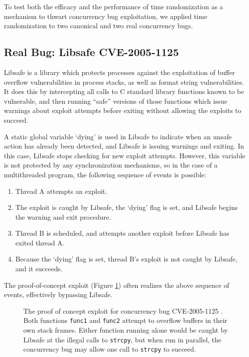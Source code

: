 To test both the efficacy and the performance of time randomization as a mechanism to thwart concurrency bug exploitation, we applied time randomization to two canonical and two real concurrency bugs.
\subsection{Real Bug: Libsafe CVE-2005-1125}
Libsafe \cite{Tsai2001} is a library which protects processes against the
exploitation of buffer overflow vulnerabilities in process stacks, as well as
format string vulnerabilities.  It does this by intercepting all calls to C
standard library functions known to be vulnerable, and then running ``safe'' versions of those functions which issue warnings about exploit attempts before exiting without allowing the exploits to succeed.

A static global variable `dying' is used in Libsafe to indicate when an unsafe action has already been detected, and Libsafe is issuing warnings and exiting.  In this case, Libsafe stops checking for new exploit attempts.  However, this variable is not protected by any synchronization mechanisms, so in the case of a multithreaded program, the following sequence of events is possible:
\begin{enumerate}
	\item Thread A attempts an exploit.
	\item The exploit is caught by Libsafe, the `dying' flag is set, and Libsafe begins the warning and exit procedure.
	\item Thread B is scheduled, and attempts another exploit before Libsafe has exited thread A.
	\item Because the `dying' flag is set, thread B's exploit is not caught by Libsafe, and it succeeds.
\end{enumerate}
The proof-of-concept exploit (Figure \ref{fig_poc})\cite{Bugtraq13190} often realizes the above sequence of events, effectively bypassing Libsafe.
\begin{figure}
	
	\caption{The proof of concept exploit for concurrency bug CVE-2005-1125 \cite{CVE-2005-1125}.  Both functions \texttt{func1} and \texttt{func2} attempt to overflow buffers in their own stack frames.  Either function running alone would be caught by Libsafe at the illegal calls to \texttt{strcpy}, but when run in parallel, the concurrency bug may allow one call to \texttt{strcpy} to succeed.}
	\label{fig_poc}
\end{figure}

